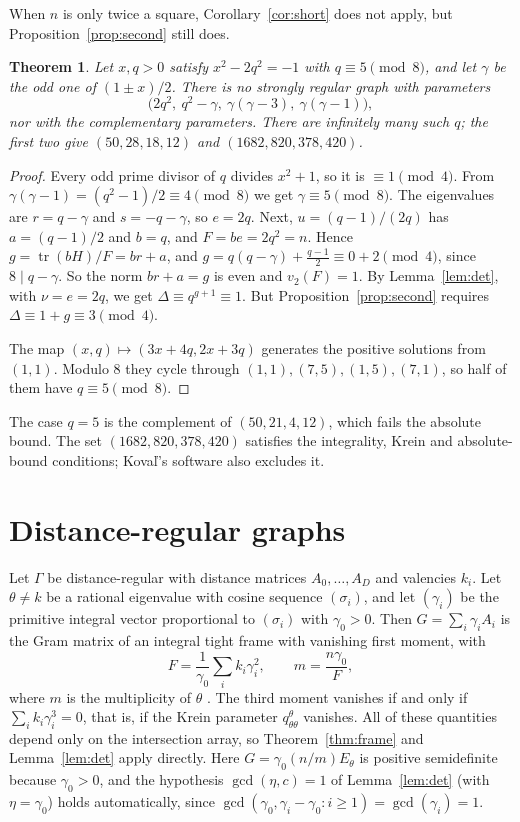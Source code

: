 \documentclass[11pt]{article}
\newtheorem{theorem}{Theorem}[section]
\theoremstyle{definition}
\theoremstyle{remark}
\begin{document}
When $n$ is only twice a square, Corollary~\ref{cor:short} does not apply,
but Proposition~\ref{prop:second} still does.

\begin{theorem}\label{thm:pell}
Let $x,q>0$ satisfy $x^2-2q^2=-1$ with $q\equiv5\pmod 8$, and let $\gamma$ be
the odd one of $(1\pm x)/2$. There is no strongly regular graph with parameters
\[
 \bigl(2q^2,\ q^2-\gamma,\ \gamma(\gamma-3),\ \gamma(\gamma-1)\bigr),
\]
nor with the complementary parameters. There are infinitely many such $q$;
the first two give $(50,28,18,12)$ and $(1682,820,378,420)$.
\end{theorem}

\begin{proof}
Every odd prime divisor of $q$ divides $x^2+1$, so it is $\equiv1\pmod 4$.
From $\gamma(\gamma-1)=(q^2-1)/2\equiv4\pmod 8$ we get $\gamma\equiv5\pmod 8$.
The eigenvalues are $r=q-\gamma$ and $s=-q-\gamma$, so $e=2q$. Next,
$u=(q-1)/(2q)$ has $a=(q-1)/2$ and $b=q$, and $F=be=2q^2=n$. Hence
$g=\operatorname{tr}(bH)/F=br+a$, and
$g=q(q-\gamma)+\tfrac{q-1}{2}\equiv0+2\pmod 4$, since $8\mid q-\gamma$. So the
norm $br+a=g$ is even and $v_2(F)=1$. By Lemma~\ref{lem:det}, with $\nu=e=2q$,
we get $\Delta\equiv q^{g+1}\equiv1$. But Proposition~\ref{prop:second}
requires $\Delta\equiv1+g\equiv3\pmod4$.

The map $(x,q)\mapsto(3x+4q,2x+3q)$ generates the positive solutions from
$(1,1)$. Modulo $8$ they cycle through $(1,1),(7,5),(1,5),(7,1)$, so half of
them have $q\equiv5\pmod 8$.
\end{proof}

The case $q=5$ is the complement of $(50,21,4,12)$, which fails the absolute
bound. The set $(1682,820,378,420)$ satisfies the integrality, Krein and
absolute-bound conditions; Kova\v l's software also excludes it.

\section{Distance-regular graphs}\label{sec:drg}

Let $\Gamma$ be distance-regular with distance matrices $A_0,\dots,A_D$ and
valencies $k_i$. Let $\theta\ne k$ be a rational eigenvalue with cosine sequence
$(\sigma_i)$, and let $(\gamma_i)$ be the primitive integral vector proportional to
$(\sigma_i)$ with $\gamma_0>0$. Then $G=\sum_i\gamma_iA_i$ is the Gram matrix of an
integral tight frame with vanishing first moment, with
\[
 F=\frac1{\gamma_0}\sum_ik_i\gamma_i^2,\qquad m=\frac{n\gamma_0}F,
\]
where $m$ is the multiplicity of $\theta$ \cite[\S4.1]{BCN}. The third moment
vanishes if and only if $\sum_ik_i\gamma_i^3=0$, that is, if the Krein parameter
$q^\theta_{\theta\theta}$ vanishes. All of these quantities depend only on the
intersection array, so Theorem~\ref{thm:frame} and Lemma~\ref{lem:det} apply
directly. Here $G=\gamma_0(n/m)E_\theta$ is positive semidefinite because
$\gamma_0>0$, and the hypothesis $\gcd(\eta,c)=1$ of Lemma~\ref{lem:det} (with
$\eta=\gamma_0$) holds automatically, since $\gcd(\gamma_0,\gamma_i-\gamma_0:
i\ge1)=\gcd(\gamma_i)=1$.
\end{document}
